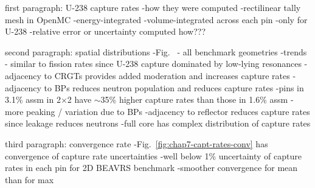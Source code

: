 first paragraph: U-238 capture rates
-how they were computed 
  -rectilinear tally mesh in OpenMC
  -energy-integrated
  -volume-integrated across each pin
  -only for U-238
-relative error or uncertainty computed how???

second paragraph: spatial distributions
-Fig.~ - all benchmark geometries
-trends - similar to fission rates since U-238 capture dominated by low-lying resonances
  -adjacency to \ac{CRGT}s provides added moderation and increases capture rates
  -adjacency to \ac{BP}s reduces neutron population and reduces capture rates
  -pins in 3.1\% assm in 2$\times$2 have $\sim$35\% higher capture rates than those in 1.6\% assm
    -more peaking / variation due to \ac{BP}s
  -adjacency to reflector reduces capture rates since leakage reduces neutrons
  -full core has complex distribution of capture rates

third paragraph: convergence rate
-Fig.~\ref{fig:chap7-capt-rates-conv} has convergence of capture rate uncertainties
-well below 1\% uncertainty of capture rates in each pin for 2D \ac{BEAVRS} benchmark
-smoother convergence for mean than for max

